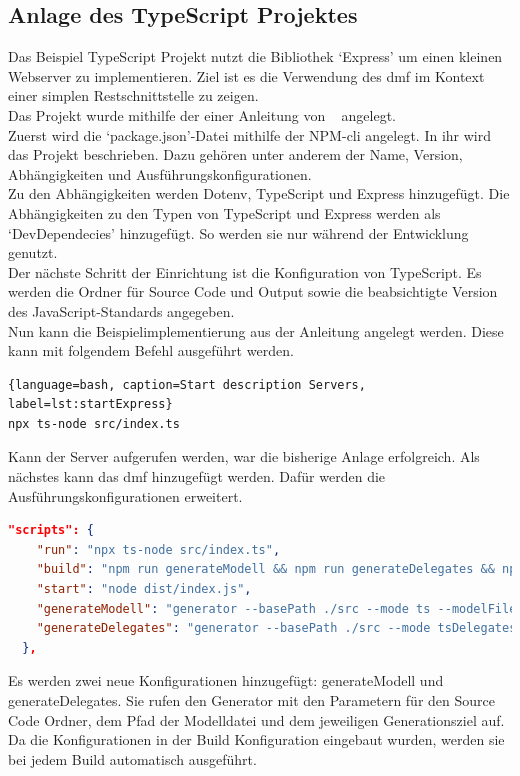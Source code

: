 \documentclass[./einleitung.tex]{subfiles}
\begin{document}
    \subsection{Anlage des TypeScript Projektes}\label{subsec:anlage-des-typescript-projektes}
    Das Beispiel TypeScript Projekt nutzt die Bibliothek `Express' um einen kleinen Webserver zu implementieren.
    Ziel ist es die Verwendung des \acrshort{dmf} im Kontext einer simplen Restschnittstelle zu zeigen.\\
    Das Projekt wurde mithilfe der einer Anleitung von \citeauthor{initExpress}~\cite{initExpress} angelegt.\\
    Zuerst wird die `package.json'-Datei mithilfe der NPM-\acrshort{cli} angelegt.
    In ihr wird das Projekt beschrieben.
    Dazu gehören unter anderem der Name, Version, Abhängigkeiten und Ausführungskonfigurationen.\\
    Zu den Abhängigkeiten werden Dotenv, TypeScript und Express hinzugefügt.
    Die Abhängigkeiten zu den Typen von TypeScript und Express werden als `DevDependecies' hinzugefügt.
    So werden sie nur während der Entwicklung genutzt.\\
    Der nächste Schritt der Einrichtung ist die Konfiguration von TypeScript.
    Es werden die Ordner für Source Code und Output sowie die beabsichtigte Version des JavaScript-Standards angegeben.\\
    Nun kann die Beispielimplementierung aus der Anleitung angelegt werden.
    Diese kann mit folgendem Befehl ausgeführt werden.
    \begin{lstlisting}{language=bash, caption=Start description Servers, label=lst:startExpress}
npx ts-node src/index.ts
    \end{lstlisting}
    Kann der Server aufgerufen werden, war die bisherige Anlage erfolgreich.
    Als nächstes kann das \acrshort{dmf} hinzugefügt werden.
    Dafür werden die Ausführungskonfigurationen erweitert.
    \begin{lstlisting}[language=json, caption=Ausführungskonfigurationen in package.json, label=lst:packageScripts]
"scripts": {
    "run": "npx ts-node src/index.ts",
    "build": "npm run generateModell && npm run generateDelegates && npx tsc",
    "start": "node dist/index.js",
    "generateModell": "generator --basePath ./src --mode ts --modelFile ../Modell/domain.dmf",
    "generateDelegates": "generator --basePath ./src --mode tsDelegates --modelFile ../Modell/domain.dmf",
  },
    \end{lstlisting}
    Es werden zwei neue Konfigurationen hinzugefügt: generateModell und generateDelegates.
    Sie rufen den Generator mit den Parametern für den Source Code Ordner, dem Pfad der Modelldatei und dem jeweiligen Generationsziel auf.
    Da die Konfigurationen in der Build Konfiguration eingebaut wurden, werden sie bei jedem Build automatisch ausgeführt.
\end{document}
